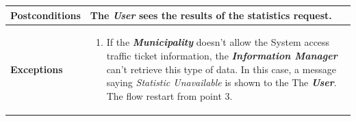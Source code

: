 \documentclass{report}
\begin{document}
\begin{tabularx}{\linewidth}{| l | X |}
	\hline
	\textbf{Postconditions} & The \textbf{\textit{User}} sees the results of the statistics request.\\
	
	\hline
	\textbf{Exceptions} & \parbox{0.7\textwidth}{ \begin{enumerate}
			\item If the \textbf{\textit{Municipality}} doesn't allow the System access traffic ticket information, the \textbf{\textit{Information Manager}} can't retrieve this type of data. In this case, a message saying \textit{Statistic Unavailable} is shown to the The \textbf{\textit{User}}. The flow restart from point 3.  
		\end{enumerate}}\\
	
	\hline
	
\end{tabularx}
\newpage
\end{document}
